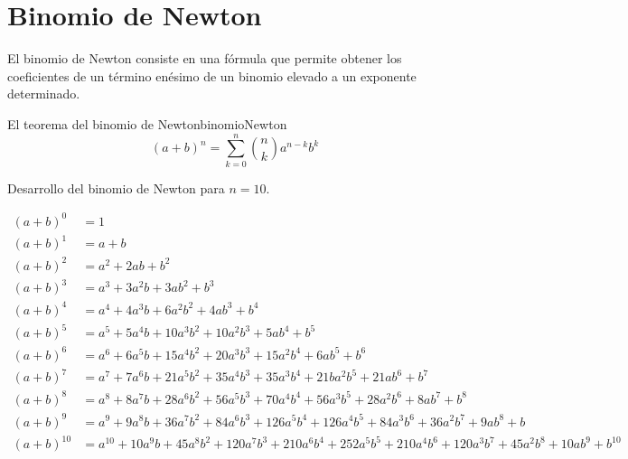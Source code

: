 
\section{Binomio de Newton}

El binomio de Newton consiste en una fórmula que permite obtener los
coeficientes de un término enésimo de un binomio elevado a un exponente
determinado.


\begin{theorem}{El teorema del binomio de Newton}{binomioNewton}
	\begin{equation}
		(a+b)^n = \sum_{k=0}^{n} \binom{n}{k} a^{n-k} b^k
	\end{equation}
\end{theorem}

Desarrollo del binomio de Newton para $n=10$.

\begin{landscape}
	\begin{equation}
		\begin{array}{lll} 
			(a+b)^0 	& =  1 \\
			(a+b)^1 	& =  a+b \\
			(a+b)^2 	& =  a^2+2ab+b^2 \\
			(a+b)^3 	& =  a^3+3a^2b+3ab^2+b^3 \\
			(a+b)^4 	& =  a^4+4a^3b+6a^2b^2+4ab^3+b^4 \\
			(a+b)^5 	& =  a^5+5a^4b+10a^3b^2+10a^2b^3+5ab^4+b^5\\
			(a+b)^6 	& =  a^6+6a^5b+15a^4b^2+20a^3b^3+15a^2b^4+6ab^5+b^6\\
			(a+b)^7 	& =  a^7+7a^6b+21a^5b^2+35a^4b^3+35a^3b^4+21ba^2b^5+21ab^6+b^7 \\
			(a+b)^8 	& =  a^8+8a^7b+28a^6b^2+56a^5b^3+70a^4b^4+56a^3b^5+28a^2b^6+8ab^7+b^8 \\
			(a+b)^9 	& =  a^9+9a^8b+36a^7b^2+84a^6b^3+126a^5b^4+126a^4b^5+84a^3b^6+36a^2b^7+9ab^8+b \\
			(a+b)^{10} 	& =  a^{10}+10a^9b+45a^8b^2+120a^7b^3+210a^6b^4+252a^5b^5+210a^4b^6+120a^3b^7+45a^2b^8+10ab^9+b^{10} \\
		\end{array}
	\end{equation}
\end{landscape}
